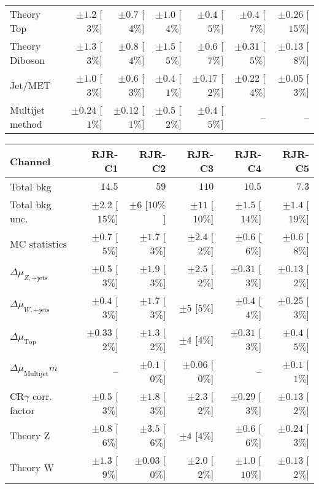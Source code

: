 \begin{table}[hbtp]
\begin{center}
\begin{tabular}{|lrrrrrr|}
Theory Top   &  $\pm 1.2$ [$3\%$]  &  $\pm 0.7$ [$4\%$]  &  $\pm 1.0$ [$4\%$]  &  $\pm 0.4$ [$5\%$]  &  $\pm 0.4$ [$7\%$]  &  $\pm 0.26$ [$15\%$] \\
Theory Diboson  &  $\pm 1.3$ [$3\%$]  &  $\pm 0.8$ [$4\%$]  &  $\pm 1.5$ [$5\%$]  &  $\pm 0.6$ [$7\%$]  &  $\pm 0.31$ [$5\%$]  &  $\pm 0.13$ [$8\%$] \\
Jet/MET   &  $\pm 1.0$ [$3\%$]  &  $\pm 0.6$ [$3\%$]  &  $\pm 0.4$ [$1\%$]  &  $\pm 0.17$ [$2\%$]  &  $\pm 0.22$ [$4\%$]  &  $\pm 0.05$ [$3\%$] \\
Multijet method  &  $\pm 0.24$ [$1\%$]  &  $\pm 0.12$ [$1\%$]  &  $\pm 0.5$ [$2\%$]  &  $\pm 0.4$ [$5\%$]  &   --    &   --   \\
\hline
\end{tabular}

\begin{tabular}{|lrrrrr|}
\hline
Channel  & \textbf{ RJR-C1 } & \textbf{ RJR-C2 } & \textbf{ RJR-C3 } & \textbf{ RJR-C4 } & \textbf{ RJR-C5 } \\ \hline
Total bkg  &  $14.5$  &  $59$  &  $110$  &  $10.5$  &  $7.3$ \\
Total bkg unc.  &  $\pm 2.2$  [$15\%$]  &  $\pm 6$  [$10\%$]  &  $\pm 11$  [$10\%$]  &  $\pm 1.5$  [$14\%$]  &  $\pm 1.4$  [$19\%$] \\
\hline
MC statistics  &  $\pm 0.7$ [$5\%$]  &  $\pm 1.7$ [$3\%$]  &  $\pm 2.4$ [$2\%$]  &  $\pm 0.6$ [$6\%$]  &  $\pm 0.6$ [$8\%$] \\
$\Delta\mu_{Z,\mathrm{+jets}}$  &  $\pm 0.5$ [$3\%$]  &  $\pm 1.9$ [$3\%$]  &  $\pm 2.5$ [$2\%$]  &  $\pm 0.31$ [$3\%$]  &  $\pm 0.13$ [$2\%$] \\
$\Delta\mu_{W,\mathrm{+jets}}$ &  $\pm 0.4$ [$3\%$]  &  $\pm 1.7$ [$3\%$]  &  $\pm 5$ [$5\%$]  &  $\pm 0.4$ [$4\%$]  &  $\pm 0.25$ [$3\%$] \\
$\Delta\mu_{\mathrm{ Top}}$  &  $\pm 0.33$ [$2\%$]  &  $\pm 1.3$ [$2\%$]  &  $\pm 4$ [$4\%$]  &  $\pm 0.31$ [$3\%$]  &  $\pm 0.4$ [$5\%$] \\
$\Delta\mu_{\mathrm{ Multijet}}m$  &  --  &  $\pm 0.1$ [$0\%$]  &  $\pm 0.06$ [$0\%$]  &   --    &  $\pm 0.1$ [$1\%$] \\
CR$\gamma$ corr. factor  &  $\pm 0.5$ [$3\%$]  &  $\pm 1.8$ [$3\%$]  &  $\pm 2.3$ [$2\%$]  &  $\pm 0.29$ [$3\%$]  &  $\pm 0.13$ [$2\%$] \\
Theory Z  &  $\pm 0.8$ [$6\%$]  &  $\pm 3.5$ [$6\%$]  &  $\pm 4$ [$4\%$]  &  $\pm 0.6$ [$6\%$]  &  $\pm 0.24$ [$3\%$] \\
Theory W  &  $\pm 1.3$ [$9\%$]  &  $\pm 0.03$ [$0\%$]  &  $\pm 2.0$ [$2\%$]  &  $\pm 1.0$ [$10\%$]  &  $\pm 0.13$ [$2\%$] \\

\end{tabular}
\end{center}
\end{table}
